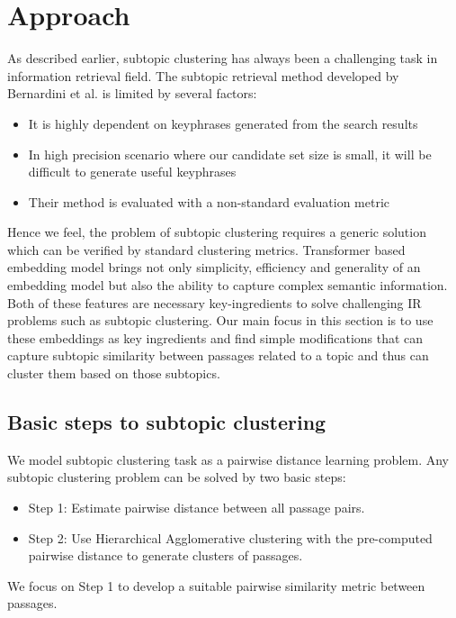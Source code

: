 \documentclass[sigconf,authordraft]{acmart}
\begin{document}
\section{Approach} As described earlier, subtopic clustering has always been a challenging task in information retrieval field. The subtopic retrieval method developed by Bernardini et al. is limited by several factors: 
\begin{itemize}
    \item It is highly dependent on keyphrases generated from the search results
    \item In high precision scenario where our candidate set size is small, it will be difficult to generate useful keyphrases
    \item Their method is evaluated with a non-standard evaluation metric
\end{itemize}
Hence we feel, the problem of subtopic clustering requires a generic solution which can be verified by standard clustering metrics. Transformer based embedding model brings not only simplicity, efficiency and generality of an embedding model but also the ability to capture complex semantic information. Both of these features are necessary key-ingredients to solve challenging IR problems such as subtopic clustering. Our main focus in this section is to use these embeddings as key ingredients and find simple modifications that can capture subtopic similarity between passages related to a topic and thus can cluster them based on those subtopics.

\subsection{Basic steps to subtopic clustering} We model subtopic clustering task as a pairwise distance learning problem. Any subtopic clustering problem can be solved by two basic steps:
\begin{itemize}
    \item Step 1: Estimate pairwise distance between all passage pairs.
    \item Step 2: Use Hierarchical Agglomerative clustering with the pre-computed pairwise distance to generate clusters of passages.
\end{itemize}

We focus on Step 1 to develop a suitable pairwise similarity metric between passages.
\end{document}
